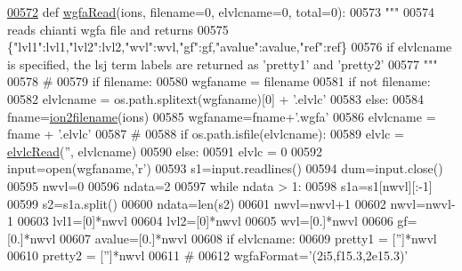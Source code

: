\begin{DoxyCode}
\hypertarget{namespacepyneb_1_1utils_1_1__chianti__tools_l00572}{}\hyperlink{namespacepyneb_1_1utils_1_1__chianti__tools_a3ef36a1d0a4df4cab94a392d2a3da980}{00572} \textcolor{keyword}{def }\hyperlink{namespacepyneb_1_1utils_1_1__chianti__tools_a3ef36a1d0a4df4cab94a392d2a3da980}{wgfaRead}(ions, filename=0, elvlcname=0, total=0):
00573     \textcolor{stringliteral}{"""}
00574 \textcolor{stringliteral}{    reads chianti wgfa file and returns}
00575 \textcolor{stringliteral}{    \{"lvl1":lvl1,"lvl2":lvl2,"wvl":wvl,"gf":gf,"avalue":avalue,"ref":ref\}}
00576 \textcolor{stringliteral}{    if elvlcname is specified, the lsj term labels are returned as 'pretty1' and 'pretty2'}
00577 \textcolor{stringliteral}{    """}
00578     \textcolor{comment}{#}
00579     \textcolor{keywordflow}{if} filename:
00580         wgfaname = filename
00581         \textcolor{keywordflow}{if} \textcolor{keywordflow}{not} filename:
00582             elvlcname = os.path.splitext(wgfaname)[0] + \textcolor{stringliteral}{'.elvlc'}
00583     \textcolor{keywordflow}{else}:
00584         fname=\hyperlink{namespacepyneb_1_1utils_1_1__chianti__tools_ad4bc7b577fd4c3819ceb00b0a444351b}{ion2filename}(ions)
00585         wgfaname=fname+\textcolor{stringliteral}{'.wgfa'}
00586         elvlcname = fname + \textcolor{stringliteral}{'.elvlc'}
00587     \textcolor{comment}{#}
00588     \textcolor{keywordflow}{if} os.path.isfile(elvlcname):
00589         elvlc = \hyperlink{namespacepyneb_1_1utils_1_1__chianti__tools_ac848d0b5ea14bf4adf6e8cd5d46fb639}{elvlcRead}(\textcolor{stringliteral}{''}, elvlcname)
00590     \textcolor{keywordflow}{else}:
00591         elvlc = 0
00592     input=open(wgfaname,\textcolor{stringliteral}{'}\textcolor{stringliteral}{r')}
00593 \textcolor{stringliteral}{    s1=input.readlines()}
00594 \textcolor{stringliteral}{    dum=input.close()}
00595 \textcolor{stringliteral}{    nwvl=0}
00596 \textcolor{stringliteral}{    ndata=2}
00597 \textcolor{stringliteral}{    }\textcolor{keywordflow}{while} ndata > 1:
00598         s1a=s1[nwvl][:-1]
00599         s2=s1a.split()
00600         ndata=len(s2)
00601         nwvl=nwvl+1
00602     nwvl=nwvl-1
00603     lvl1=[0]*nwvl
00604     lvl2=[0]*nwvl
00605     wvl=[0.]*nwvl
00606     gf=[0.]*nwvl
00607     avalue=[0.]*nwvl
00608     \textcolor{keywordflow}{if} elvlcname:
00609         pretty1 = [\textcolor{stringliteral}{''}]*nwvl
00610         pretty2 = [\textcolor{stringliteral}{''}]*nwvl
00611     \textcolor{comment}{#}
00612     wgfaFormat=\textcolor{stringliteral}{'(2i5,f15.3,2e15.3)'}

\end{DoxyCode}
